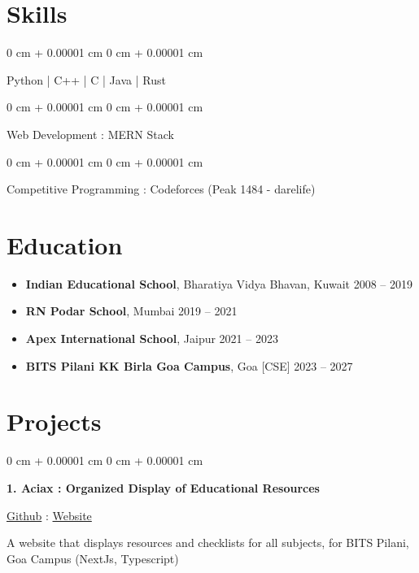 \documentclass[10pt, letterpaper]{article}
\newenvironment{onecolentry}{
    \begin{adjustwidth}{
        0 cm + 0.00001 cm
    }{
        0 cm + 0.00001 cm
    }
}{
    \end{adjustwidth}
}
\newenvironment{twocolentry}[2][]{
    \onecolentry
    \def\secondColumn{#2}
    \setcolumnwidth{\fill, 4.7 cm} %
    \begin{paracol}{2}
}{
    \switchcolumn \raggedleft \secondColumn
    \end{paracol}
    \endonecolentry
}
\begin{document}
    \section{Skills}
        \begin{onecolentry}
            Python | C++ | C | Java | Rust
        \end{onecolentry}
        \vspace{0.15cm} %
        \begin{onecolentry}
            Web Development : MERN Stack
        \end{onecolentry}
        \vspace{0.15cm} %
        \begin{onecolentry}
            Competitive Programming : Codeforces (Peak 1484 - darelife)
        \end{onecolentry}

    \section{Education}
        \begin{itemize}[itemsep=0.2cm] %
            \item \textbf{Indian Educational School}, Bharatiya Vidya Bhavan, Kuwait \hfill 2008 -- 2019
            \item \textbf{RN Podar School}, Mumbai \hfill 2019 -- 2021
            \item \textbf{Apex International School}, Jaipur \hfill 2021 -- 2023
            \item \textbf{BITS Pilani KK Birla Goa Campus}, Goa [CSE] \hfill 2023 -- 2027
        \end{itemize}

    \section{Projects}
        \begin{twocolentry}{
            \href{https://github.com/Darelife/aciax}{Github} : \href{https://aciax.vercel.app/}{Website}
        }
            \textbf{1. Aciax : Organized Display of Educational Resources}
        \end{twocolentry}

        \vspace{0.15 cm} %
        A website that displays resources and checklists for all subjects, for BITS Pilani, Goa Campus (NextJs, Typescript)
\end{document}
